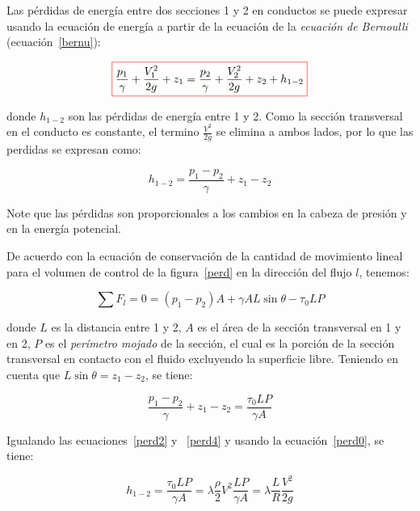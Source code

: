 \documentclass[11pt, oneside]{article}
\begin{document}
Las p\'erdidas de energ\'ia entre dos secciones 1 y 2 en conductos se puede expresar usando la ecuaci\'on de energ\'ia a partir de la ecuaci\'on de la \emph{ecuaci\'on de Bernoulli} (ecuaci\'on~\ref{bernu}):

\begin{equation}
\color{red}\boxed{\color{black} \frac{p_1}{\gamma} + \frac{V_1^2}{2g} + z_1 = \frac{p_2}{\gamma} + \frac{V_2^2}{2g} + z_2 + h_{1-2}  }
\label{perd1}
\end{equation}

donde $h_{1-2}$ son las p\'erdidas de energ\'ia entre 1 y 2. Como la secci\'on transversal en el conducto es constante, el termino $\frac{V^2}{2g}$ se elimina a ambos lados, por lo que las perdidas se expresan como:
 
\begin{equation}
h_{1-2} = \frac{p_1 - p_2}{\gamma} + z_1 - z_2
\label{perd2}
\end{equation}

Note que las p\'erdidas son proporcionales a los cambios en la cabeza de presi\'on y en la energ\'ia potencial.

De acuerdo con la ecuaci\'on de conservaci\'on de la cantidad de movimiento lineal para  el volumen de control de la  figura~\ref{perd} en la direcci\'on del flujo $l$, tenemos:

\begin{equation}
\sum F_l = 0 = (p_1 - p_2)A + \gamma AL \sin \theta - \tau_0 L P
\label{perd3}
\end{equation}

donde $L$ es la distancia entre 1 y 2, $A$ es el \'area de la secci\'on transversal en 1 y en 2, $P$ es el \emph{per\'imetro mojado} de la secci\'on, el cual es la porci\'on de la secci\'on transversal en contacto con el fluido excluyendo la superficie libre. Teniendo en cuenta que $L\sin \theta = z_1 - z_2$, se tiene:
 
\begin{equation}
\frac{p_1 - p_2}{\gamma} + z_1 - z_2 = \frac{\tau_0 L P}{\gamma A}
\label{perd4}
\end{equation}

Igualando las ecuaciones~\ref{perd2} y ~\ref{perd4} y usando la ecuaci\'on~\ref{perd0}, se tiene:

\begin{equation}
h_{1-2} = \frac{\tau_0 LP}{\gamma A} = \lambda \frac{\rho}{2}V^2 \frac{LP}{\gamma A} =\lambda \frac{L}{R} \frac{V^2}{2g}
\label{perd5}
\end{equation}
\end{document}

